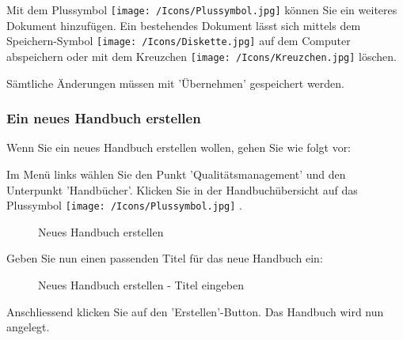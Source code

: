 Mit dem Plussymbol \texttt{[image: /Icons/Plussymbol.jpg]}  können Sie ein weiteres Dokument hinzufügen. Ein bestehendes Dokument lässt sich mittels dem Speichern-Symbol \texttt{[image: /Icons/Diskette.jpg]}  auf dem Computer abspeichern oder mit dem Kreuzchen \texttt{[image: /Icons/Kreuzchen.jpg]}  löschen.

Sämtliche Änderungen müssen mit 'Übernehmen'  gespeichert werden. 

\subsubsection{Ein neues Handbuch erstellen}
\label{bkm:Ref930000788}

Wenn Sie ein neues Handbuch erstellen wollen, gehen Sie wie folgt vor:

Im Menü links wählen Sie den Punkt 'Qualitätsmanagement' und den Unterpunkt 'Handbücher'. Klicken Sie in der Handbuchübersicht auf das Plussymbol \texttt{[image: /Icons/Plussymbol.jpg]} .

\begin{figure}[H]
\caption{Neues Handbuch erstellen}
\end{figure}

Geben Sie nun einen passenden Titel für das neue Handbuch ein: 

\begin{figure}[H]
\caption{Neues Handbuch erstellen - Titel eingeben}
\end{figure}

Anschliessend klicken Sie auf den 'Erstellen'-Button. Das Handbuch wird nun angelegt.

